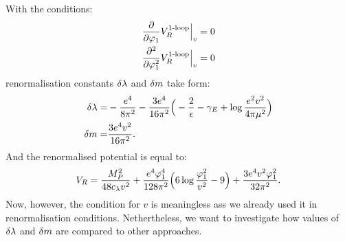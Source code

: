 With the conditions:
\begin{align}
\frac{\partial }{\partial \varphi_1}V_R^{\textrm{1-loop}}\Big|_{v} &= 0 \\
\frac{\partial^2 }{\partial \varphi_1^2}V_R^{\textrm{1-loop}}\Big|_{v} &= 0
\end{align}
renormalisation constants $\delta\lambda$ and $\delta m$ take form:
\begin{align}
\delta\lambda =& -\frac{e^4}{8\pi^2}-\frac{3e^4}{16\pi^2}\Big(-\frac{2}{\epsilon}-\gamma_E+\log{
\frac{e^2v^2}{4\pi\mu^2}}\Big)\\
\delta m =& \frac{3e^4v^2}{16\pi^2}.
\end{align}
And the renormalised potential is equal to:
\begin{align}
V_R = \frac{M_P^2}{48c_\lambda v^2}+\frac{e^4\varphi_1^4}{128\pi^2}\Big(6\log{
\frac{\varphi_1^2}{v^2}} - 9\Big)+\frac{3e^4v^2\varphi_1^2}{32\pi^2}.
\end{align}
Now, however, the condition for $v$ is meaningless ass we already used it in renormalisation 
conditions. Nethertheless, we want to investigate how values of $\delta\lambda$ and $\delta m$ are compared 
to other approaches.
